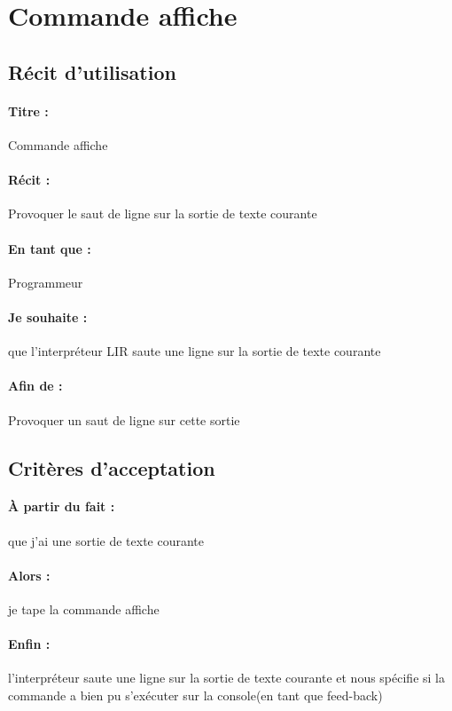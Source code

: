     \section{Commande affiche}

	\subsection*{Récit d'utilisation}

	\paragraph{Titre : } Commande affiche
	\paragraph{Récit : }  Provoquer le saut de ligne sur la sortie de texte courante
	\paragraph{En tant que : } Programmeur
	\paragraph{Je souhaite : } que l'interpréteur LIR saute une ligne sur la sortie de texte courante
	\paragraph{Afin de : } Provoquer un saut de ligne sur cette sortie

	\subsection*{Critères d'acceptation}

	\paragraph{À partir du fait : } que j'ai une sortie de texte courante
	\paragraph{Alors : } je tape la commande affiche
	\paragraph{Enfin : } l'interpréteur saute une ligne sur la sortie de texte courante et nous spécifie si la commande a bien pu s'exécuter sur la console(en tant que feed-back)
